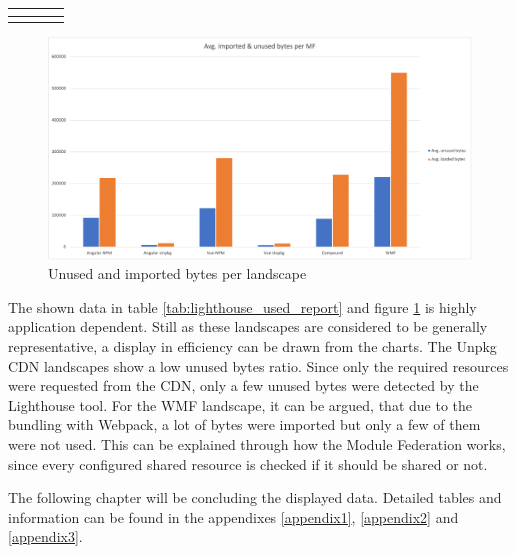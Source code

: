 \begin{longtable}[c]{*{4}{p{\mycolwidthtwo}}}
	&  					
	&     
	&  \\ \midrule
	
	&  						   
	&    
	&   \\ \midrule
\end{longtable}

\begin{figure}[!h]
	\centering
	\includegraphics[width=1\textwidth]{Figures/avg_unsed_imported_1.png}
	\caption{Unused and imported bytes per landscape}
	\label{fig:unsed_imported_1}
\end{figure}


\normalsize
The shown data in table \ref{tab:lighthouse_used_report} and figure \ref{fig:unsed_imported_1} is highly application dependent. Still as these landscapes are considered to be generally representative, a display in efficiency can be drawn from the charts.
The Unpkg CDN landscapes show a low unused bytes ratio. Since only the required resources were requested from the CDN, only a few unused bytes were detected by the Lighthouse tool. 
For the WMF landscape, it can be argued, that due to the bundling with Webpack, a lot of bytes were imported but only a few of them were not used. This can be explained through how the Module Federation works, since every configured shared resource is checked if it should be shared or not.

The following chapter will be concluding the displayed data. Detailed tables and information can be found in the appendixes \ref{appendix1}, \ref{appendix2} and \ref{appendix3}.
